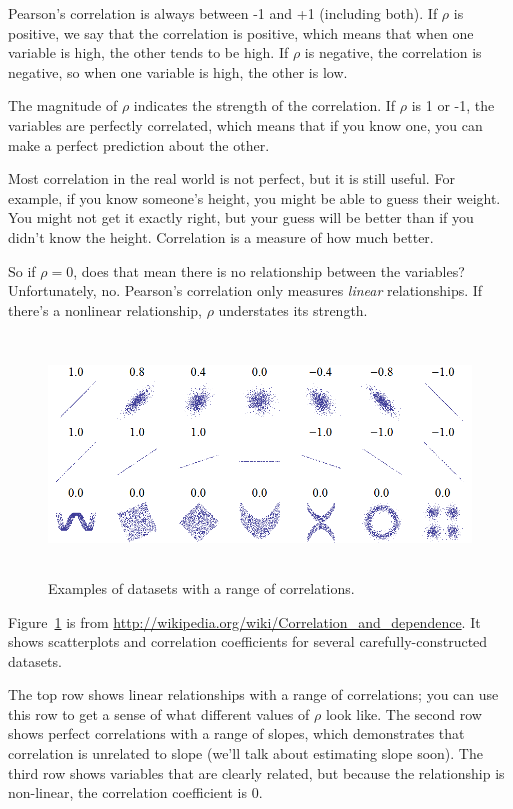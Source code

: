 \documentclass[12pt]{book}
\begin{document}
Pearson's correlation is always between -1 and +1 (including both).
If $\rho$ is positive, we say that the correlation is positive,
which means that when one variable is high, the other tends to be
high.  If $\rho$ is negative, the correlation is negative, so
when one variable is high, the other is low.

The magnitude of $\rho$ indicates the strength of the correlation.  If
$\rho$ is 1 or -1, the variables are perfectly correlated, which means
that if you know one, you can make a perfect prediction about the
other.  

Most correlation in the real world is not perfect, but it
is still useful.  For example, if you know someone's height, you might
be able to guess their weight.  You might not get it exactly right, but
your guess will be better than if you didn't know the height.
Correlation is a measure of how much better.

So if $\rho = 0$, does that mean there is no
relationship between the variables?  Unfortunately, no.  Pearson's
correlation only measures {\em linear} relationships.  If there's a
nonlinear relationship, $\rho$ understates its strength.

\begin{figure}
\centerline{\includegraphics[height=2.5in]{figs/Correlation_examples.png}}
\caption{Examples of datasets with a range of correlations.}
\label{corr_examples}
\end{figure}

Figure~\ref{corr_examples} is from
\url{http://wikipedia.org/wiki/Correlation_and_dependence}.  It shows
scatterplots and correlation coefficients for several
carefully-constructed datasets.

The top row shows linear relationships with a range of correlations;
you can use this row to get a sense of what different values of
$\rho$ look like.  The second row shows perfect correlations with a
range of slopes, which demonstrates that correlation is unrelated to
slope (we'll talk about estimating slope soon).  The third row shows
variables that are clearly related, but because the relationship is
non-linear, the correlation coefficient is 0.
\end{document}
